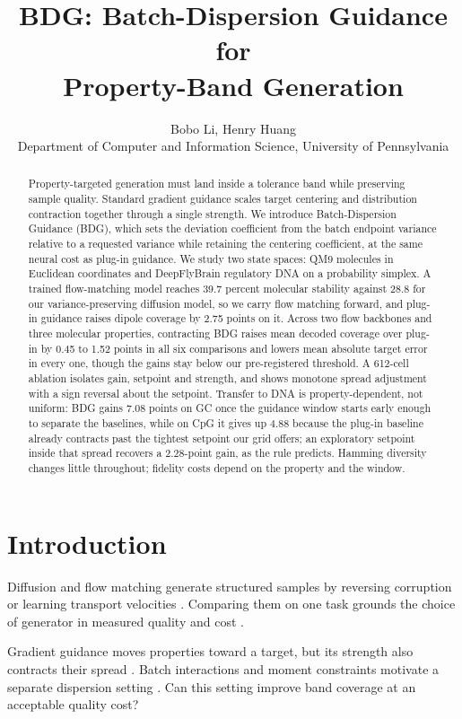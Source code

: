 \documentclass{article}
\title{BDG: Batch-Dispersion Guidance for\\Property-Band Generation}
\author{Bobo Li, Henry Huang\\
Department of Computer and Information Science, University of Pennsylvania}
\begin{document}
\maketitle
\begin{abstract}
Property-targeted generation must land inside a tolerance band while preserving sample quality. Standard gradient guidance scales target centering and distribution contraction together through a single strength. We introduce Batch-Dispersion Guidance (BDG), which sets the deviation coefficient from the batch endpoint variance relative to a requested variance while retaining the centering coefficient, at the same neural cost as plug-in guidance. We study two state spaces: QM9 molecules in Euclidean coordinates and DeepFlyBrain regulatory DNA on a probability simplex. A trained flow-matching model reaches 39.7 percent molecular stability against 28.8 for our variance-preserving diffusion model, so we carry flow matching forward, and plug-in guidance raises dipole coverage by 2.75 points on it. Across two flow backbones and three molecular properties, contracting BDG raises mean decoded coverage over plug-in by 0.45 to 1.52 points in all six comparisons and lowers mean absolute target error in every one, though the gains stay below our pre-registered threshold. A 612-cell ablation isolates gain, setpoint and strength, and shows monotone spread adjustment with a sign reversal about the setpoint. Transfer to DNA is property-dependent, not uniform: BDG gains 7.08 points on GC once the guidance window starts early enough to separate the baselines, while on CpG it gives up 4.88 because the plug-in baseline already contracts past the tightest setpoint our grid offers; an exploratory setpoint inside that spread recovers a 2.28-point gain, as the rule predicts. Hamming diversity changes little throughout; fidelity costs depend on the property and the window.
\end{abstract}

\section{Introduction}
Diffusion and flow matching generate structured samples by reversing corruption or learning transport velocities \citep{karras2022elucidating,lipman2022flow}. Comparing them on one task grounds the choice of generator in measured quality and cost \citep{albergo2025stochastic}.

Gradient guidance moves properties toward a target, but its strength also contracts their spread \citep{chung2023dps,song2023lgd}. Batch interactions and moment constraints motivate a separate dispersion setting \citep{corso2024particle,mgd2026moment}. Can this setting improve band coverage at an acceptable quality cost?
\end{document}
